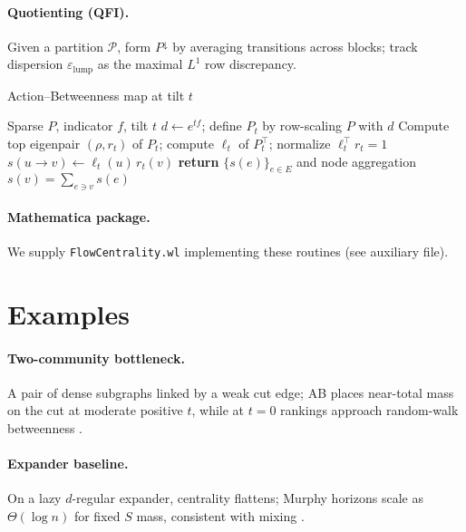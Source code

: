 \documentclass[11pt]{article}
\newcommand{\1}{\mathbbm{1}}
\begin{document}
\paragraph{Quotienting (QFI).}
Given a partition $\mathcal{P}$, form $P^{\downarrow}$ by averaging transitions across blocks; track dispersion $\varepsilon_{\mathrm{lump}}$ as the maximal $L^1$ row discrepancy.

\begin{algorithm}[h]
\caption{Action--Betweenness map at tilt $t$}
\begin{algorithmic}[1]
\Require Sparse $P$, indicator $f$, tilt $t$
\State $d \gets e^{t f}$; \quad define $P_t$ by row-scaling $P$ with $d$
\State Compute top eigenpair $(\rho,r_t)$ of $P_t$; compute $\ell_t$ of $P_t^\top$; normalize $\ell_t^\top r_t=1$
  \State $s(u\!\to\! v) \gets \ell_t(u)\, r_t(v)$ 
\EndFor
\State \textbf{return} $\{s(e)\}_{e\in E}$ and node aggregation $s(v)=\sum_{e\ni v} s(e)$
\end{algorithmic}
\end{algorithm}

\paragraph{Mathematica package.}
We supply \texttt{FlowCentrality.wl} implementing these routines (see auxiliary file).

\section{Examples}\label{sec:examples}
\paragraph{Two-community bottleneck.}
A pair of dense subgraphs linked by a weak cut edge; AB places near-total mass on the cut at moderate positive $t$, while at $t=0$ rankings approach random-walk betweenness \parencite{Newman2005}.

\paragraph{Expander baseline.}
On a lazy $d$-regular expander, centrality flattens; Murphy horizons scale as $\Theta(\log n)$ for fixed $S$ mass, consistent with mixing \parencite{HooryLinialWigderson2006,LevinPeresWilmer2009}.
\end{document}
